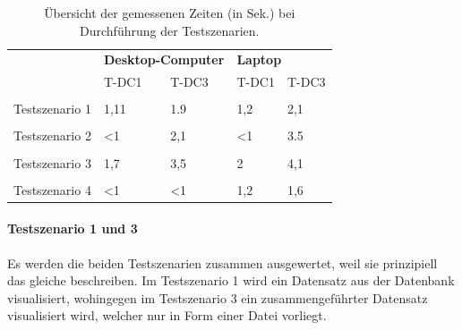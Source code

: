 \documentclass[11pt]{article}
\begin{document}
\begin{table}[htbp]
\small
\begin{center}
\begin{tabularx}{13.5cm}{p{4cm} p{1.7cm} p{2.8cm} p{1.7cm} p{1.7cm}}
    &
    \multicolumn{2}{l}{\textbf{Desktop-Computer}} &
    \multicolumn{2}{l}{\textbf{Laptop}} \\[0.3cm]
    
    & T-DC1 & T-DC3
    & T-DC1 & T-DC3

\\
\toprule 
\\

    Testszenario 1 & 1,11 & 1.9 & 1,2 & 2,1   \\[0.2cm]
    
\toprule    
\\
    
    Testszenario 2 & <1 & 2,1 & <1 & 3.5  \\[0.2cm]
    
\toprule    
\\
    
    Testszenario 3 & 1,7 & 3,5 & 2 & 4,1  \\[0.2cm]
    
\toprule    
\\
    
    Testszenario 4 & <1 & <1 & 1,2 & 1,6 \\[0.2cm]
    
\bottomrule

\end{tabularx}
\end{center}
\caption{Übersicht der gemessenen Zeiten (in Sek.) bei Durchführung der Testszenarien.}
\label{tab:evaluationTestDataCubes}
\end{table}

\paragraph{Testszenario 1 und 3} Es werden die beiden Testszenarien zusammen ausgewertet, weil sie prinzipiell das gleiche beschreiben. Im Testszenario 1 wird ein Datensatz aus der Datenbank visualisiert, wohingegen im Testszenario 3 ein zusammengeführter Datensatz visualisiert wird, welcher nur in Form einer Datei vorliegt. 
\end{document}
